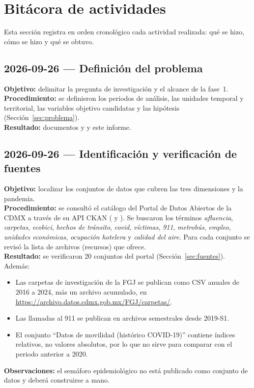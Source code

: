 \section{Bitácora de actividades}\label{sec:bitacora}

Esta sección registra en orden cronológico cada actividad realizada: qué se hizo, cómo se hizo
y qué se obtuvo.


\subsection{2026-09-26 --- Definición del problema}
\textbf{Objetivo:} delimitar la pregunta de investigación y el alcance de la fase~1.\\
\textbf{Procedimiento:} se definieron los periodos de análisis, las unidades temporal y territorial,
las variables objetivo candidatas y las hipótesis (Sección~\ref{sec:problema}).\\
\textbf{Resultado:} documentos  y  y este informe.

\subsection{2026-09-26 --- Identificación y verificación de fuentes}
\textbf{Objetivo:} localizar los conjuntos de datos que cubren las tres dimensiones y la pandemia.\\
\textbf{Procedimiento:} se consultó el catálogo del Portal de Datos Abiertos de la CDMX a través de
su API CKAN ( y ). Se buscaron los
términos \emph{afluencia}, \emph{carpetas}, \emph{ecobici}, \emph{hechos de tránsito}, \emph{covid},
\emph{víctimas}, \emph{911}, \emph{metrobús}, \emph{empleo}, \emph{unidades económicas},
\emph{ocupación hotelera} y \emph{calidad del aire}. Para cada conjunto se revisó la lista de
archivos (recursos) que ofrece.\\
\textbf{Resultado:} se verificaron 20 conjuntos del portal (Sección~\ref{sec:fuentes}). Además:
\begin{itemize}
  \item Las carpetas de investigación de la FGJ se publican como CSV anuales de 2016 a 2024, más un
        archivo acumulado, en \url{https://archivo.datos.cdmx.gob.mx/FGJ/carpetas/}.
  \item Las llamadas al 911 se publican en archivos semestrales desde 2019-S1.
  \item El conjunto \enquote{Datos de movilidad (histórico COVID-19)} contiene índices relativos, no
        valores absolutos, por lo que no sirve para comparar con el periodo anterior a 2020.
\end{itemize}
\textbf{Observaciones:} el semáforo epidemiológico no está publicado como conjunto de datos y deberá
construirse a mano.

